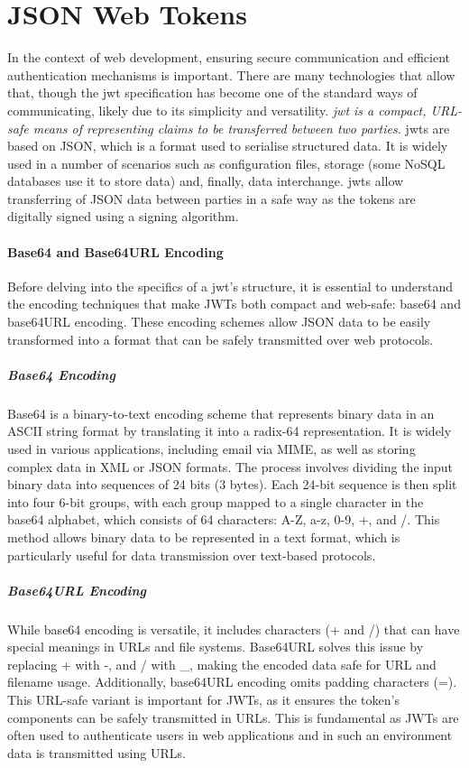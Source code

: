 \chapter{JSON Web Tokens}
In the context of web development, ensuring secure communication and efficient authentication mechanisms is important.  There are many technologies that allow that, though the \gls{jwt} specification has become one of the standard ways of communicating, likely due to its simplicity and versatility. \textit{\gls{jwt} is a compact, URL-safe means of representing
claims to be transferred between two parties.} \cite{rfc7519-jwt} \gls{jwt}s are based on JSON, which is a format used to serialise structured data.\cite{rfc8259-json} It is widely used in a number of scenarios such as configuration files, storage (some NoSQL databases use it to store data) and, finally, data interchange. \gls{jwt}s allow transferring of JSON data between parties in a safe way as the tokens are digitally signed using a signing algorithm.
\subsubsection*{Base64 and Base64URL Encoding}
Before delving into the specifics of a \gls{jwt}'s structure, it is essential to understand the \gls{encoding} techniques that make JWTs both compact and web-safe: base64 and base64URL \gls{encoding}. These \gls{encoding} schemes allow JSON data to be easily transformed into a format that can be safely transmitted over web protocols.
\paragraph{Base64 Encoding} 
Base64 is a binary-to-text \gls{encoding} scheme that represents binary data in an ASCII string format by translating it into a radix-64 representation. It is widely used in various applications, including email via MIME, as well as storing complex data in XML or JSON formats.
The process involves dividing the input binary data into sequences of 24 bits (3 bytes). Each 24-bit sequence is then split into four 6-bit groups, with each group mapped to a single character in the base64 alphabet, which consists of 64 characters: A-Z, a-z, 0-9, +, and /. This method allows binary data to be represented in a text format, which is particularly useful for data transmission over text-based protocols. \cite{rfc4648-b64}
\paragraph{Base64URL Encoding} 
While base64 \gls{encoding} is versatile, it includes characters (+ and /) that can have special meanings in URLs and file systems. Base64URL solves this issue by replacing + with -, and / with \_, making the encoded data safe for URL and filename usage. Additionally, base64URL \gls{encoding} omits padding characters (=).
This URL-safe variant is important for JWTs, as it ensures the token's components can be safely transmitted in URLs. This is fundamental as JWTs are often used to authenticate users in web applications and in such an environment data is transmitted using URLs. \cite{rfc4648-b64}


